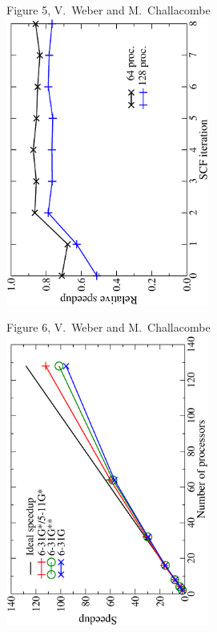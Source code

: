 \documentclass[prl,preprint,doublespace]{revtex4} %
\begin{document}
{\clearpage

\begin{center}
Figure 5, V.~Weber  and M.~Challacombe \\[1.cm]
\includegraphics[angle=-90,width=0.5\textwidth]{h2o_50_prop}
\end{center}

\clearpage

\begin{center}
Figure 6, V.~Weber  and M.~Challacombe \\[1.cm]
  \includegraphics[angle=-90,width=0.5\textwidth]{h2o_pbc_64}
\end{center}

\clearpage

}
\end{document}
